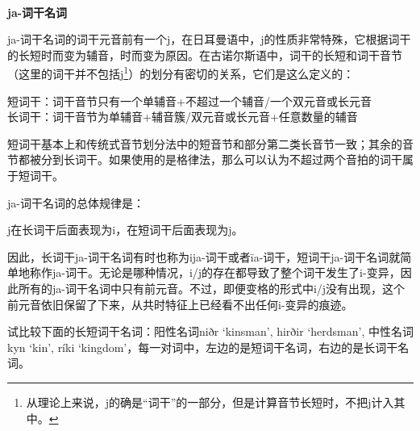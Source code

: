 ~\\
\textbf{ja-词干名词}

ja-词干名词的词干元音前有一个j，在日耳曼语中，j的性质非常特殊，它根据词干的长短时而变为辅音，时而变为原因。在古诺尔斯语中，词干的长短和词干音节（这里的词干并不包括j\footnote{从理论上来说，j的确是``词干''的一部分，但是计算音节长短时，不把j计入其中。}）的划分有密切的关系，它们是这么定义的：

\begin{info}
短词干：词干音节只有一个单辅音+不超过一个辅音/一个双元音或长元音\\
长词干：词干音节为单辅音+辅音簇/双元音或长元音+任意数量的辅音
\end{info}

短词干基本上和传统式音节划分法中的短音节和部分第二类长音节一致；其余的音节都被分到长词干。如果使用的是格律法，那么可以认为不超过两个音拍的词干属于短词干。

ja-词干名词的总体规律是：

\begin{info}
j在长词干后面表现为i，在短词干后面表现为j。
\end{info}

因此，长词干ja-词干名词有时也称为ija-词干或者īa-词干，短词干ja-词干名词就简单地称作ja-词干。无论是哪种情况，i/j的存在都导致了整个词干发生了i-变异，因此所有的ja-词干名词中只有前元音。不过，即便变格的形式中i/j没有出现，这个前元音依旧保留了下来，从共时特征上已经看不出任何i-变异的痕迹。

试比较下面的长短词干名词：阳性名词niðr `kinsman', hirðir `herdsman',
中性名词kyn `kin', ríki
`kingdom'，每一对词中，左边的是短词干名词，右边的是长词干名词。


